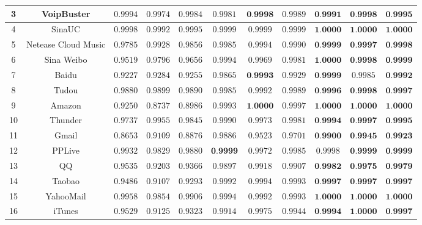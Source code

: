 \documentclass[degree=master,cjk-font=noto]{thuthesis}
\begin{document}
\begin{table}[!htp]
\begin{center}
\begin{center}
\begin{tabular}{c|c|c c c|c c c|c c c}
			3 & VoipBuster & $0.9994$ & $0.9974$ & $0.9984$ & $0.9981$ & $\textbf{0.9998}$ & $0.9989$ & $\textbf{0.9991}$ & $\textbf{0.9998}$ & $\textbf{0.9995}$ \\\hline
			4 & SinaUC & $0.9998$ & $0.9992$ & $0.9995$ & $0.9999$ & $0.9999$ & $0.9999$ & $\textbf{1.0000}$ & $\textbf{1.0000}$ & $\textbf{1.0000}$ \\\hline
			5 & Netease Cloud Music & $0.9785$ & $0.9928$ & $0.9856$ & $0.9985$ & $0.9994$ & $0.9990$ & $\textbf{0.9999}$ & $\textbf{0.9997}$ & $\textbf{0.9998}$ \\\hline
			6 & Sina Weibo & $0.9519$ & $0.9796$ & $0.9656$ & $0.9994$ & $0.9969$ & $0.9981$ & $\textbf{1.0000}$ & $\textbf{0.9998}$ & $\textbf{0.9999}$ \\\hline
			7 & Baidu & $0.9227$ & $0.9284$ & $0.9255$ & $0.9865$ & $\textbf{0.9993}$ & $0.9929$ & $\textbf{0.9999}$ & $0.9985$ & $\textbf{0.9992}$ \\\hline
			8 & Tudou & $0.9880$ & $0.9899$ & $0.9890$ & $0.9985$ & $0.9992$ & $0.9989$ & $\textbf{0.9996}$ & $\textbf{0.9998}$ & $\textbf{0.9997}$ \\\hline
			9 & Amazon & $0.9250$ & $0.8737$ & $0.8986$ & $0.9993$ & $\textbf{1.0000}$ & $0.9997$ & $\textbf{1.0000}$ & $\textbf{1.0000}$ & $\textbf{1.0000}$ \\\hline
			10 & Thunder & $0.9737$ & $0.9955$ & $0.9845$ & $0.9990$ & $0.9973$ & $0.9981$ & $\textbf{0.9994}$ & $\textbf{0.9997}$ & $\textbf{0.9995}$ \\\hline
			11 & Gmail & $0.8653$ & $0.9109$ & $0.8876$ & $0.9886$ & $0.9523$ & $0.9701$ & $\textbf{0.9900}$ & $\textbf{0.9945}$ & $\textbf{0.9923}$ \\\hline
			12 & PPLive & $0.9932$ & $0.9829$ & $0.9880$ & $\textbf{0.9999}$ & $0.9972$ & $0.9985$ & $0.9998$ & $\textbf{0.9999}$ & $\textbf{0.9999}$ \\\hline
			13 & QQ & $0.9535$ & $0.9203$ & $0.9366$ & $0.9897$ & $0.9918$ & $0.9907$ & $\textbf{0.9982}$ & $\textbf{0.9975}$ & $\textbf{0.9979}$ \\\hline
			14 & Taobao & $0.9486$ & $0.9107$ & $0.9293$ & $0.9992$ & $0.9994$ & $0.9993$ & $\textbf{0.9997}$ & $\textbf{0.9997}$ & $\textbf{0.9997}$ \\\hline
			15 & YahooMail & $0.9958$ & $0.9854$ & $0.9906$ & $0.9994$ & $0.9992$ & $0.9993$ & $\textbf{1.0000}$ & $\textbf{1.0000}$ & $\textbf{1.0000}$ \\\hline
			16 & iTunes & $0.9529$ & $0.9125$ & $0.9323$ & $0.9914$ & $0.9975$ & $0.9944$ & $\textbf{0.9994}$ & $\textbf{1.0000}$ & $\textbf{0.9997}$ \\\hline

\end{tabular}
\end{center}
\end{center}
\end{table}
\end{document}

